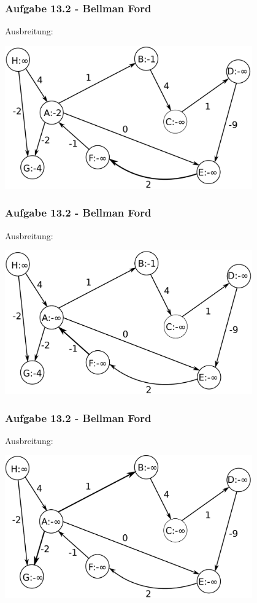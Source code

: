 \documentclass{beamer}
\begin{document}
\begin{frame}
	\frametitle{Aufgabe 13.2 - Bellman Ford}
	Ausbreitung:
	\begin{center}
		\includegraphics[width=0.8\textwidth]{images/bellman_ford_i4.png}
	\end{center}
\end{frame}

\begin{frame}
	\frametitle{Aufgabe 13.2 - Bellman Ford}
	Ausbreitung:
	\begin{center}
		\includegraphics[width=0.8\textwidth]{images/bellman_ford_i5.png}
	\end{center}
\end{frame}

\begin{frame}
	\frametitle{Aufgabe 13.2 - Bellman Ford}
	Ausbreitung:
	\begin{center}
		\includegraphics[width=0.8\textwidth]{images/bellman_ford_i6.png}
	\end{center}
\end{frame}
\end{document}
